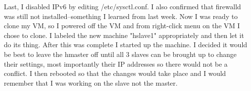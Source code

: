\documentclass[10pt]{article}
\begin{document}
\hfill
{}%
\par
Last, I disabled IPv6 by editing /etc/sysctl.conf. I also confirmed that firewalld was still not installed--something I learned from last week. Now I was ready to clone my VM, so I powered off the VM and from right-click menu on the VM I chose to clone. I labeled the new machine "hslave1" appropriately and then let it do its thing. After this was complete I started up the machine. I decided it would be best to leave the hmaster off until all 3 slaves can be brought up to change their settings, most importantly their IP addresses so there would not be a conflict. I then rebooted so that the changes would take place and I would remember that I was working on the slave not the master.
\par
{}%
\hfill
{}%
\end{document}
